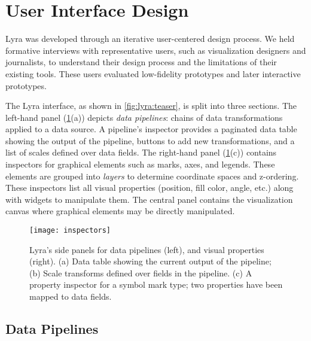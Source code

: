 
\vspace{-10pt}

\section{User Interface Design}

\vspace{-10pt}

Lyra was developed through an iterative user-centered design process. We held
formative interviews with representative users, such as visualization designers
and journalists, to understand their design process and the limitations of their
existing tools. These users evaluated low-fidelity prototypes and later
interactive prototypes.

The Lyra interface, as shown in \cref{fig:lyra:teaser}, is split into three
sections. The left-hand panel (\cref{fig:lyra:inspectors}(a)) depicts \emph{data
pipelines}: chains of data transformations applied to a data source. A
pipeline's inspector provides a paginated data table showing the output of the
pipeline, buttons to add new transformations, and a list of scales defined over
data fields. The right-hand panel (\cref{fig:lyra:inspectors}(c)) contains
inspectors for graphical elements such as marks, axes, and legends. These
elements are grouped into \emph{layers} to determine coordinate spaces and
z-ordering. These inspectors list all visual properties (position, fill color,
angle, etc.) along with widgets to manipulate them. The central panel contains
the visualization canvas where graphical elements may be directly manipulated.

\begin{figure}[t!]
\texttt{[image: inspectors]}
\caption{Lyra's side panels for data pipelines (left), and
visual properties (right). (a) Data table showing the current output
of the pipeline; (b) Scale transforms defined over fields in the pipeline.
(c) A property inspector for a symbol mark type; two properties have been
mapped to data fields.}
\label{fig:lyra:inspectors}
\end{figure}

\vspace{-10pt}

\subsection{Data Pipelines}

